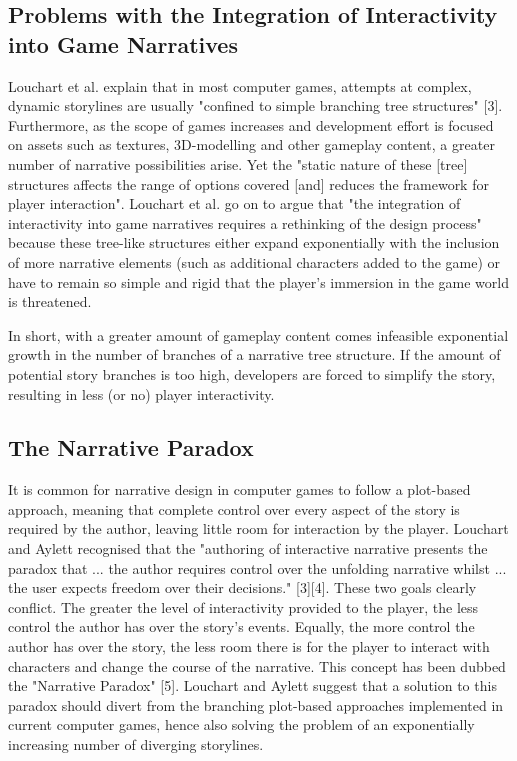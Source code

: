 \documentclass{article}
\begin{document}
\subsection{Problems with the Integration of Interactivity into Game Narratives}

Louchart et al. explain that in most computer games, attempts at complex, dynamic storylines are usually "confined to simple branching tree structures" [3]. Furthermore, as the scope of games increases and development effort is focused on assets such as textures, 3D-modelling and other gameplay content, a greater number of narrative possibilities arise. Yet the "static nature of these [tree] structures affects the range of options covered [and] reduces the framework for player interaction". Louchart et al. go on to argue that "the integration of interactivity into game narratives requires a rethinking of the design process" because these tree-like structures either expand exponentially with the inclusion of more narrative elements (such as additional characters added to the game) or have to remain so simple and rigid that the player's immersion in the game world is threatened.

In short, with a greater amount of gameplay content comes infeasible exponential growth in the number of branches of a narrative tree structure. If the amount of potential story branches is too high, developers are forced to simplify the story, resulting in less (or no) player interactivity.

\subsection{The Narrative Paradox}

It is common for narrative design in computer games to follow a plot-based approach, meaning that complete control over every aspect of the story is required by the author, leaving little room for interaction by the player. Louchart and Aylett recognised that the "authoring of interactive narrative presents the paradox that ... the author requires control over the unfolding narrative whilst ... the user expects freedom over their decisions." [3][4]. These two goals clearly conflict. The greater the level of interactivity provided to the player, the less control the author has over the story's events. Equally, the more control the author has over the story, the less room there is for the player to interact with characters and change the course of the narrative. This concept has been dubbed the "Narrative Paradox" [5]. Louchart and Aylett suggest that a solution to this paradox should divert from the branching plot-based approaches implemented in current computer games, hence also solving the problem of an exponentially increasing number of diverging storylines.
\end{document}
